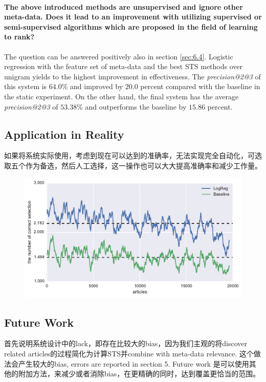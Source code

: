 \paragraph{The above introduced methods are unsupervised and ignore other meta-data. Does it lead to an improvement with utilizing supervised or semi-supervised algorithms which are proposed in the field of learning to rank?}

The question can be answered positively also in section \ref{sec:6.4}. Logistic regression with the feature set of meta-data and the best STS methods over unigram yields to the highest improvement in effectiveness. The \textit{precision@2@3} of this system is $64.0\%$ and improved by $20.0$ percent compared with the baseline in the static experiment. On the other hand, the final system has the average \textit{precision@2@3} of $53.38\%$ and outperforms the baseline by $15.86$ percent. 

\subsection{Application in Reality}
如果将系统实际使用，考虑到现在可以达到的准确率，无法实现完全自动化，可选取五个作为备选，然后人工选择，这一操作也可以大大提高准确率和减少工作量。


\begin{figure}[!htb]
    \centering
    \includegraphics[width=\textwidth]{fig/precision_inc_supervised_5}
    \caption[]{}
    \label{fig:top5}
\end{figure}

\subsection{Future Work}
首先说明系统设计中的lack，即存在比较大的bias，因为我们主观的将discover related articles的过程简化为计算STS并combine with meta-data relevance. 这个做法会产生较大的bias, errors are reported in section 5. Future work 是可以使用其他的附加方法，来减少或者消除bias，在更精确的同时，达到覆盖更恰当的范围。
